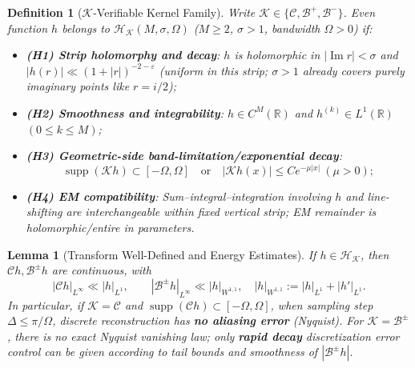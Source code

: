 \documentclass[11pt,a4paper]{article}
\newtheorem{lemma}[theorem]{Lemma}
\newtheorem{definition}[theorem]{Definition}
\theoremstyle{remark}
\DeclareMathOperator{\Im}{Im}
\DeclareMathOperator{\supp}{supp}
\begin{document}
\begin{definition}[$\mathcal{K}$-Verifiable Kernel Family]\label{def:kernel}
Write $\mathcal{K}\in\{\mathcal{C},\mathcal{B}^{+},\mathcal{B}^{-}\}$. Even function $h$ belongs to $\mathscr{H}_{\mathcal{K}}(M,\sigma,\Omega)$ ($M\ge2$, $\sigma>1$, bandwidth $\Omega>0$) if:
\begin{itemize}
\item \textbf{(H1) Strip holomorphy and decay}: $h$ is holomorphic in $|\Im r|<\sigma$ and $|h(r)|\ll (1+|r|)^{-2-\varepsilon}$ (uniform in this strip; $\sigma>1$ already covers purely imaginary points like $r=i/2$);

\item \textbf{(H2) Smoothness and integrability}: $h\in C^M(\mathbb{R})$ and $h^{(k)}\in L^1(\mathbb{R})$ $(0\le k\le M)$;

\item \textbf{(H3) Geometric-side band-limitation/exponential decay}:
\begin{equation}
\supp(\mathcal{K} h)\subset[-\Omega,\Omega]\quad\text{or}\quad
|\mathcal{K} h(x)|\le C e^{-\mu|x|}\ (\mu>0);
\end{equation}

\item \textbf{(H4) EM compatibility}: Sum--integral--integration involving $h$ and line-shifting are interchangeable within fixed vertical strip; EM remainder is holomorphic/entire in parameters.
\end{itemize}
\end{definition}

\begin{lemma}[Transform Well-Defined and Energy Estimates]\label{lem:transform}
If $h\in \mathscr{H}_{\mathcal{K}}$, then $\mathcal{C} h,\mathcal{B}^\pm h$ are continuous, with
\begin{equation}
|\mathcal{C} h|_{L^\infty}\ll |h|_{L^1},\qquad
|\mathcal{B}^{\pm}h|_{L^\infty}\ll |h|_{W^{1,1}},\quad
|h|_{W^{1,1}}:=|h|_{L^1}+|h'|_{L^1}.
\end{equation}
In particular, if $\mathcal{K}=\mathcal{C}$ and $\supp(\mathcal{C} h)\subset[-\Omega,\Omega]$, when sampling step $\Delta\le \pi/\Omega$, discrete reconstruction has \textbf{no aliasing error} (Nyquist). For $\mathcal{K}=\mathcal{B}^{\pm}$, there is no exact Nyquist vanishing law; only \textbf{rapid decay} discretization error control can be given according to tail bounds and smoothness of $|\mathcal{B}^{\pm}h|$.
\end{lemma}
\end{document}
